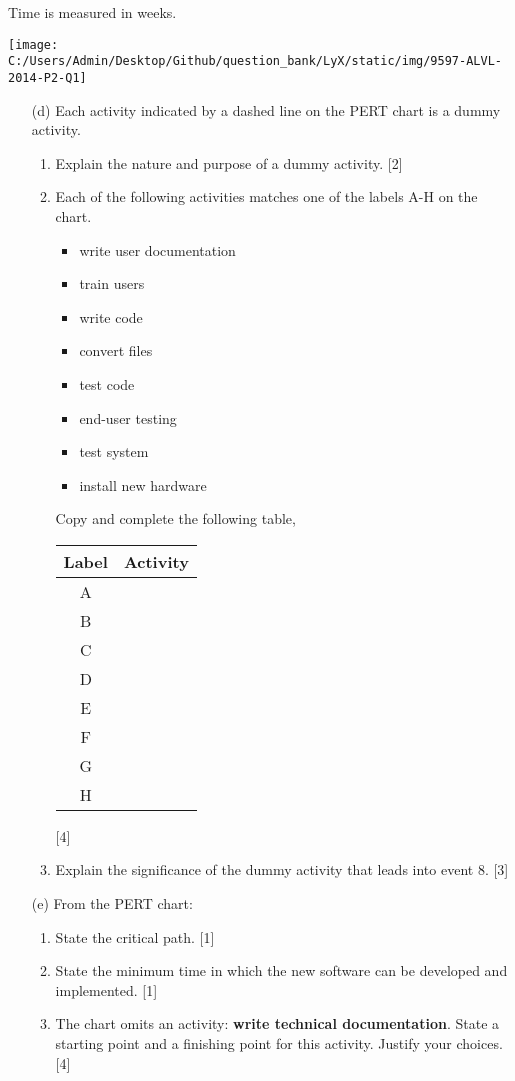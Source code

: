 Time is measured in weeks. 
\begin{center}
\texttt{[image: C:/Users/Admin/Desktop/Github/question\_bank/LyX/static/img/9597-ALVL-2014-P2-Q1]}
\par\end{center}
\begin{enumerate}
\item[(d)]  Each activity indicated by a dashed line on the PERT chart is a
dummy activity.
\begin{enumerate}
\item Explain the nature and purpose of a dummy activity.\hfill{} {[}2{]}
\item Each of the following activities matches one of the labels A-H on
the chart.
\begin{itemize}
\item write user documentation 
\item train users 
\item write code 
\item convert files
\item test code 
\item end-user testing 
\item test system 
\item install new hardware
\end{itemize}
Copy and complete the following table, 
\begin{center}
\begin{tabular}{|c|>{\centering}p{}|}
\hline 
Label & Activity\tabularnewline
\hline 
A & \tabularnewline
\hline 
B & \tabularnewline
\hline 
C & \tabularnewline
\hline 
D & \tabularnewline
\hline 
E & \tabularnewline
\hline 
F & \tabularnewline
\hline 
G & \tabularnewline
\hline 
H & \tabularnewline
\hline 
\end{tabular}
\par\end{center}

\hfill{}{[}4{]}
\item Explain the significance of the dummy activity that leads into event
8. \hfill{}{[}3{]}
\end{enumerate}
\item[(e)]  From the PERT chart:
\begin{enumerate}
\item State the critical path.\hfill{} {[}1{]}
\item State the minimum time in which the new software can be developed
and implemented.\hfill{} {[}1{]}
\item The chart omits an activity: \textbf{write technical documentation}.
State a starting point and a finishing point for this activity. Justify
your choices. \hfill{}{[}4{]}
\end{enumerate}
\end{enumerate}
